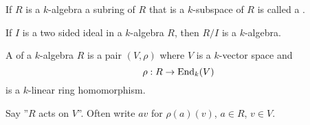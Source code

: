   \begin{define}
    If $R$ is a $k$-algebra a subring of $R$ that is a $k$-subspace of $R$ is
    called a .
  \end{define}
  
  If $I$ is a two sided ideal in a $k$-algebra $R$, then $R/I$ is a $k$-algebra.

  \begin{define}
    A  of a $k$-algebra $R$ is a pair $(V,\rho)$ where $V$
    is a $k$-vector space and
    \[ \rho: R \to \operatorname{End}_k(V) \]
    is a $k$-linear ring homomorphism.
  \end{define}
  Say ''$R$ acts on $V$''. Often write $av$ for $\rho(a)(v)$, $a\in R$, $v\in V$.
